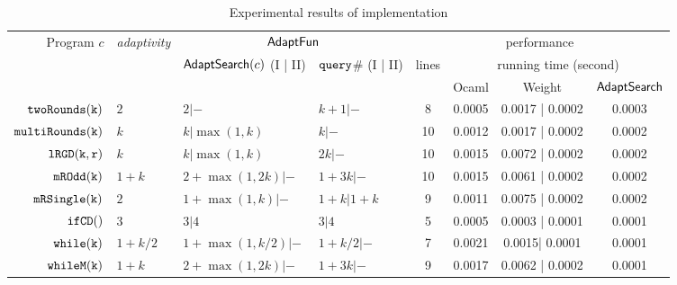 {\footnotesize
\begin {table}[H]
\vspace{-0.5cm}
    \caption{Experimental results of {\THESYSTEM} implementation}
    \vspace{-0.5cm}
        \label{tb:adapt-imp}
        \begin{center}
        \centering
{\tiny
        \begin{tabular}{ r | l | l | l | c | c | c | c  }
        \multirow{3}{*}{Program $c$} & 
        \multirow{3}{*}{\emph{adaptivity}}
         & \multicolumn{2}{c|}{$\textsf{AdaptFun}$}
         & \multicolumn{4}{c}{performance} \\ 
         \cline{3-8}
         & & \multirow{2}{*}{$\mathsf{AdaptSearch}(c)$ (I | II) } & \multirow{2}{*}{${\tt query}$\# (I | II) } & \multirow{2}{*}{lines} & \multicolumn{3}{c}{running time (second)} \\ 
         \cline{6-8}
         & & & &  & Ocaml & Weight & $\mathsf{AdaptSearch}$  \\
         \hline \hline
         $  \mathtt{twoRounds(k)}$ & $2$ &  $2| -$ & $k+1 | -$  & 8 & 0.0005 & 0.0017 | 0.0002 & 0.0003 \\
         $  \mathtt{multiRounds(k)}$ & $k$ &  $k| \max(1,k)$ & $k| -$  &  10 & 0.0012 & 0.0017 | 0.0002 & 0.0002 \\
         $  \mathtt{lRGD(k, r)}$ & $k$ & $k | \max(1,k) $ & $ 2k | -$  &  10 & 0.0015 & 0.0072 | 0.0002 & 0.0002  \\
         $  \mathtt{mROdd(k)}$ & $1 + k$ &  $2+\max(1,2k) | - $ & $1 + 3 k | - $  &  10 & 0.0015 & 0.0061 | 0.0002 & 0.0002 \\
         $  \mathtt{mRSingle(k)}$    & $2$ &  $1+ \max(1, k) | -$ & $1 + k | 1 + k$  &  9 & 0.0011 & 0.0075 | 0.0002 & 0.0002 \\
         $  \mathtt{ifCD()}$ & $3$ & $3 | 4$ &   $3| 4$  & 5 & 0.0005 & 0.0003 | 0.0001  & 0.0001 \\
         $  \mathtt{while(k)}$ & $1+k/2$ &   $1 +\max(1, k/2) |- $  &  $1+k/2 | - $ & 7 & 0.0021 & 0.0015| 0.0001 &  0.0001 \\
         $  \mathtt{whileM(k)}$ & $1 + k$ &  $ 2 + \max(1,2k) | -$ & $1 + 3k | - $  &  9 & 0.0017 & 0.0062 | 0.0002 & 0.0001  \\

\end{tabular}}
\end{center}
\end{table}}
